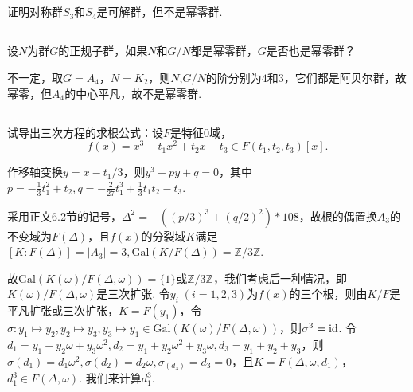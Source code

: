 
\subsection{}
证明对称群$S_3$和$S_4$是可解群，但不是幂零群.


\subsection{}
设$N$为群$G$的正规子群，如果$N$和$G/N$都是幂零群，$G$是否也是幂零群？

\jie 不一定，取$G=A_4$，$N=K_2$，则$N$,$G/N$的阶分别为$4$和$3$，它们都是阿贝尔群，故幂零，但$A_4$的中心平凡，故不是幂零群.

\subsection{}
试导出三次方程的求根公式：设$F$是特征$0$域，
$$f(x)=x^3-t_1x^2+t_2x-t_3\in F(t_1,t_2,t_3)[x].$$

\jie 作移轴变换$y=x-t_1/3$，则$y^3+py+q=0$，其中$p=-\frac{1}{3}t_1^2+t_2,q=-\frac{2}{27}t_1^3+\frac{1}{3}t_1t_2-t_3$.

采用正文6.2节的记号，$\Delta^2=-((p/3)^3+(q/2)^2)*108$，故根的偶置换$A_3$的不变域为$F(\Delta)$，且$f(x)$的分裂域$K$满足$[K:F(\Delta)]=|A_3|=3, \mathrm{Gal}(K/F(\Delta))=\mathbb{Z}/3\mathbb{Z}$.

故$\mathrm{Gal}(K(\omega)/F(\Delta, \omega))=\{1\}$或$\mathbb{Z}/3\mathbb{Z}$，我们考虑后一种情况，即$K(\omega)/F(\Delta, \omega)$是三次扩张. 令$y_i\;(i=1,2,3)$为$f(x)$的三个根，则由$K/F$是平凡扩张或三次扩张，$K=F(y_1)$，令$\sigma: y_1\mapsto y_2, y_2\mapsto y_3, y_3\mapsto y_1\in \mathrm{Gal}(K(\omega)/F(\Delta, \omega))$，则$\sigma^3=\operatorname{id}$. 令$d_1=y_1+y_2\omega+y_3\omega^2, d_2=y_1+y_2\omega^2+y_3\omega, d_3=y_1+y_2+y_3$，则$\sigma(d_1)=d_1\omega^2, \sigma(d_2)=d_2\omega, \sigma_(d_3)=d_3=0$，且$K=F(\Delta, \omega, d_1)$，$d_1^3\in F(\Delta, \omega)$. 我们来计算$d_1^3$.

